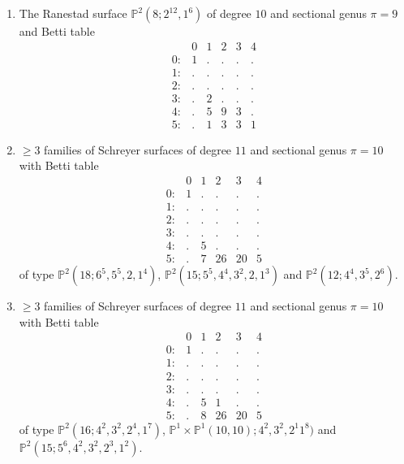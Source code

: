 \documentclass[twoside,12pt, leqno]{amsart}
\def\PP{{\mathbb P}}
\begin{document}
\begin{enumerate}
      
 \item The Ranestad surface $\PP^{2}(8;2^{12},1^{6})$ of degree $10$ and sectional genus $\pi=9$ and Betti table     
$$\begin{matrix}
        & 0 & 1 & 2 & 3 & 4\\
       0: & 1 & . & . & . & .\\
       1: & . & . & . & . & .\\
       2: & . & . & . & . & .\\
       3: & . & 2 & . & . & .\\
       4: & . & 5 & 9 & 3 & .\\
       5: & . & 1 & 3 & 3 & 1
       \end{matrix}$$


\item $\ge 3$ families of Schreyer surfaces of degree $11$ and sectional genus $\pi=10$ with Betti table
$$\begin{matrix}
       & 0 & 1 & 2 & 3 & 4\\
      0: & 1 & . & . & . & .\\
      1: & . & . & . & . & .\\
      2: & . & . & . & . & .\\
      3: & . & . & . & . & .\\
      4: & . & 5 & . & . & .\\
      5: & . & 7 & 26 & 20 & 5
      \end{matrix}$$
of type $\PP^{2}(18;6^{5},5^{5},2,1^{4})$, $\PP^{2}(15;5^{5},4^{4},3^{2},2,1^{3})$ and $\PP^{2}(12;4^{4},3^{5},2^{6})$.


\item $\ge 3$ families of Schreyer surfaces of  degree $11$ and sectional genus $\pi=10$ with Betti table
$$\begin{matrix}
       & 0 & 1 & 2 & 3 & 4\\
      0: & 1 & . & . & . & .\\
      1: & . & . & . & . & .\\
      2: & . & . & . & . & .\\
      3: & . & . & . & . & .\\
      4: & . & 5 & 1 & . & .\\
      5: & . & 8 & 26 & 20 & 5
      \end{matrix}$$
of type $\PP^{2}(16;4^{2},3^{2},2^{4},1^{7})$, $\PP^{1}\times \PP^{1}(10,10);4^{2},3^{2},2^{1}1^{8})$ and $\PP^{2}(15;5^{6},4^{2},3^{2},2^{3},1^{2})$.
 

\end{enumerate}
\end{document}
